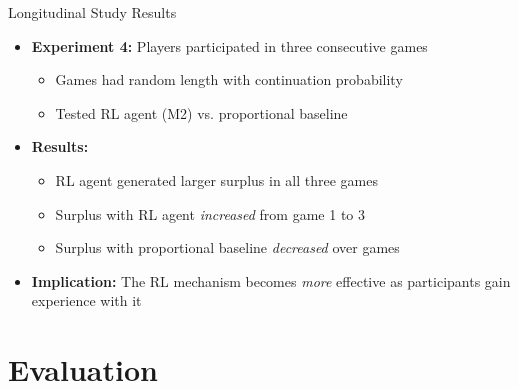 \documentclass[aspectratio=169]{beamer} %
\begin{document}
\begin{frame}{Longitudinal Study Results}
\begin{itemize}
    \item \textbf{Experiment 4:} Players participated in three consecutive games
    \begin{itemize}
        \item Games had random length with continuation probability
        \item Tested RL agent (M2) vs. proportional baseline
    \end{itemize}
    
    \item \textbf{Results:}
    \begin{itemize}
        \item RL agent generated larger surplus in all three games
        \item Surplus with RL agent \textit{increased} from game 1 to 3
        \item Surplus with proportional baseline \textit{decreased} over games
    \end{itemize}
    
    \item \textbf{Implication:} The RL mechanism becomes \textit{more} effective as participants gain experience with it
\end{itemize}
\end{frame}

\section{Evaluation}
\end{document}
